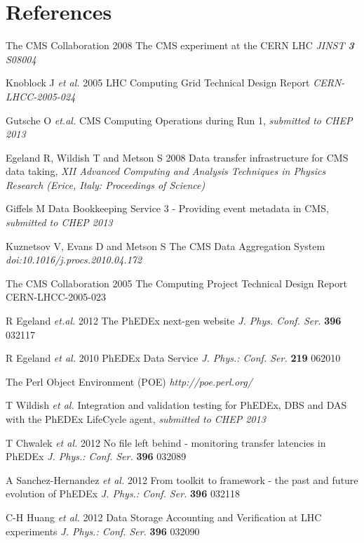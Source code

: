 \section*{References}

\begin{thebibliography}{1}
The CMS Collaboration 2008 The CMS experiment at the CERN LHC {\it JINST {\bf 3} S08004}

Knoblock J {\it et al.} 2005 LHC Computing Grid Technical Design Report {\it CERN-LHCC-2005-024}

 Gutsche O {\it et.al.} CMS Computing Operations during Run 1, {\it submitted to CHEP 2013}

  Egeland R, Wildish T and Metson S 2008 Data transfer infrastructure for CMS data taking,  {\it XII Advanced Computing and Analysis Techniques in Physics Research (Erice, Italy: Proceedings of Science)}

Giffels M Data Bookkeeping Service 3 - Providing event metadata in CMS, {\it submitted to CHEP 2013}

Kuznetsov V, Evans D and Metson S The CMS Data Aggregation System
{\it doi:10.1016/j.procs.2010.04.172}

The CMS Collaboration 2005 The Computing Project Technical Design Report CERN-LHCC-2005-023

R Egeland {\it et.al.} 2012  The PhEDEx next-gen website {\it J. Phys. Conf. Ser.} {\bf 396} 032117

R Egeland {\it et al.} 2010  PhEDEx Data Service {\it J. Phys.: Conf. Ser.} {\bf 219} 062010

The Perl Object Environment (POE)  {\it http://poe.perl.org/}

T Wildish {\it et al.} Integration and validation testing for PhEDEx, DBS and DAS with the PhEDEx LifeCycle agent,
{\it submitted to CHEP 2013}

T Chwalek {\it et al.} 2012  No file left behind - monitoring transfer latencies in PhEDEx {\it J. Phys.: Conf. Ser.} {\bf 396} 032089

A Sanchez-Hernandez {\it et al.} 2012 From toolkit to framework - the past and future evolution of PhEDEx {\it J. Phys.: Conf. Ser.} {\bf 396} 032118

C-H Huang {\it et al.}  2012 Data Storage Accounting and Verification at LHC experiments  {\it J. Phys.: Conf. Ser.} {\bf 396} 032090 


\end{thebibliography}

